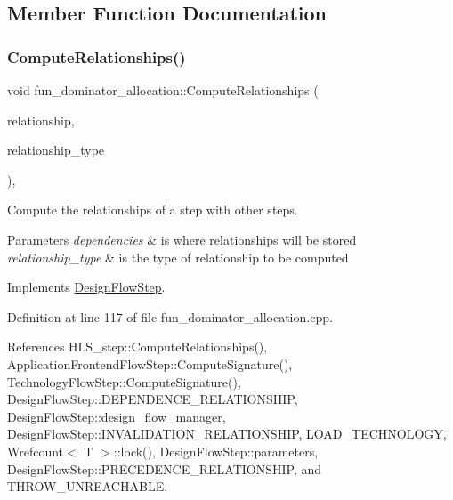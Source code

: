 \subsection{Member Function Documentation}
\mbox{\label{classfun__dominator__allocation_aced73fc0e76b139d3fca739237f0542b}} 
\subsubsection{\texorpdfstring{Compute\+Relationships()}{ComputeRelationships()}}
{\footnotesize\ttfamily void fun\+\_\+dominator\+\_\+allocation\+::\+Compute\+Relationships (\begin{DoxyParamCaption}\item[{\hyperlink{classDesignFlowStepSet}{Design\+Flow\+Step\+Set} \&}]{relationship,  }\item[{const \hyperlink{classDesignFlowStep_a723a3baf19ff2ceb77bc13e099d0b1b7}{Design\+Flow\+Step\+::\+Relationship\+Type}}]{relationship\+\_\+type }\end{DoxyParamCaption})\hspace{0.3cm}{\ttfamily [override]}, {\ttfamily [virtual]}}



Compute the relationships of a step with other steps. 


\begin{DoxyParams}{Parameters}
{\em dependencies} & is where relationships will be stored \\
\hline
{\em relationship\+\_\+type} & is the type of relationship to be computed \\
\hline
\end{DoxyParams}


Implements \hyperlink{classDesignFlowStep_a65bf7bcb603189a7ddcf930c3a9fd7fe}{Design\+Flow\+Step}.



Definition at line 117 of file fun\+\_\+dominator\+\_\+allocation.\+cpp.



References H\+L\+S\+\_\+step\+::\+Compute\+Relationships(), Application\+Frontend\+Flow\+Step\+::\+Compute\+Signature(), Technology\+Flow\+Step\+::\+Compute\+Signature(), Design\+Flow\+Step\+::\+D\+E\+P\+E\+N\+D\+E\+N\+C\+E\+\_\+\+R\+E\+L\+A\+T\+I\+O\+N\+S\+H\+IP, Design\+Flow\+Step\+::design\+\_\+flow\+\_\+manager, Design\+Flow\+Step\+::\+I\+N\+V\+A\+L\+I\+D\+A\+T\+I\+O\+N\+\_\+\+R\+E\+L\+A\+T\+I\+O\+N\+S\+H\+IP, L\+O\+A\+D\+\_\+\+T\+E\+C\+H\+N\+O\+L\+O\+GY, Wrefcount$<$ T $>$\+::lock(), Design\+Flow\+Step\+::parameters, Design\+Flow\+Step\+::\+P\+R\+E\+C\+E\+D\+E\+N\+C\+E\+\_\+\+R\+E\+L\+A\+T\+I\+O\+N\+S\+H\+IP, and T\+H\+R\+O\+W\+\_\+\+U\+N\+R\+E\+A\+C\+H\+A\+B\+LE.

